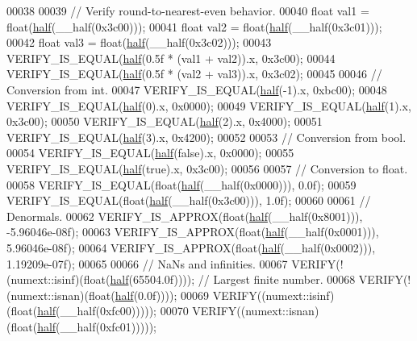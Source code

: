 \begin{DoxyCode}
00038 
00039   \textcolor{comment}{// Verify round-to-nearest-even behavior.}
00040   \textcolor{keywordtype}{float} val1 = float(\hyperlink{struct_eigen_1_1half}{half}(\_\_half(0x3c00)));
00041   \textcolor{keywordtype}{float} val2 = float(\hyperlink{struct_eigen_1_1half}{half}(\_\_half(0x3c01)));
00042   \textcolor{keywordtype}{float} val3 = float(\hyperlink{struct_eigen_1_1half}{half}(\_\_half(0x3c02)));
00043   VERIFY\_IS\_EQUAL(\hyperlink{struct_eigen_1_1half}{half}(0.5f * (val1 + val2)).x, 0x3c00);
00044   VERIFY\_IS\_EQUAL(\hyperlink{struct_eigen_1_1half}{half}(0.5f * (val2 + val3)).x, 0x3c02);
00045 
00046   \textcolor{comment}{// Conversion from int.}
00047   VERIFY\_IS\_EQUAL(\hyperlink{struct_eigen_1_1half}{half}(-1).x, 0xbc00);
00048   VERIFY\_IS\_EQUAL(\hyperlink{struct_eigen_1_1half}{half}(0).x, 0x0000);
00049   VERIFY\_IS\_EQUAL(\hyperlink{struct_eigen_1_1half}{half}(1).x, 0x3c00);
00050   VERIFY\_IS\_EQUAL(\hyperlink{struct_eigen_1_1half}{half}(2).x, 0x4000);
00051   VERIFY\_IS\_EQUAL(\hyperlink{struct_eigen_1_1half}{half}(3).x, 0x4200);
00052 
00053   \textcolor{comment}{// Conversion from bool.}
00054   VERIFY\_IS\_EQUAL(\hyperlink{struct_eigen_1_1half}{half}(\textcolor{keyword}{false}).x, 0x0000);
00055   VERIFY\_IS\_EQUAL(\hyperlink{struct_eigen_1_1half}{half}(\textcolor{keyword}{true}).x, 0x3c00);
00056 
00057   \textcolor{comment}{// Conversion to float.}
00058   VERIFY\_IS\_EQUAL(\textcolor{keywordtype}{float}(\hyperlink{struct_eigen_1_1half}{half}(\_\_half(0x0000))), 0.0f);
00059   VERIFY\_IS\_EQUAL(\textcolor{keywordtype}{float}(\hyperlink{struct_eigen_1_1half}{half}(\_\_half(0x3c00))), 1.0f);
00060 
00061   \textcolor{comment}{// Denormals.}
00062   VERIFY\_IS\_APPROX(\textcolor{keywordtype}{float}(\hyperlink{struct_eigen_1_1half}{half}(\_\_half(0x8001))), -5.96046e-08f);
00063   VERIFY\_IS\_APPROX(\textcolor{keywordtype}{float}(\hyperlink{struct_eigen_1_1half}{half}(\_\_half(0x0001))), 5.96046e-08f);
00064   VERIFY\_IS\_APPROX(\textcolor{keywordtype}{float}(\hyperlink{struct_eigen_1_1half}{half}(\_\_half(0x0002))), 1.19209e-07f);
00065 
00066   \textcolor{comment}{// NaNs and infinities.}
00067   VERIFY(!(numext::isinf)(\textcolor{keywordtype}{float}(\hyperlink{struct_eigen_1_1half}{half}(65504.0f))));  \textcolor{comment}{// Largest finite number.}
00068   VERIFY(!(numext::isnan)(\textcolor{keywordtype}{float}(\hyperlink{struct_eigen_1_1half}{half}(0.0f))));
00069   VERIFY((numext::isinf)(\textcolor{keywordtype}{float}(\hyperlink{struct_eigen_1_1half}{half}(\_\_half(0xfc00)))));
00070   VERIFY((numext::isnan)(\textcolor{keywordtype}{float}(\hyperlink{struct_eigen_1_1half}{half}(\_\_half(0xfc01)))));

\end{DoxyCode}
